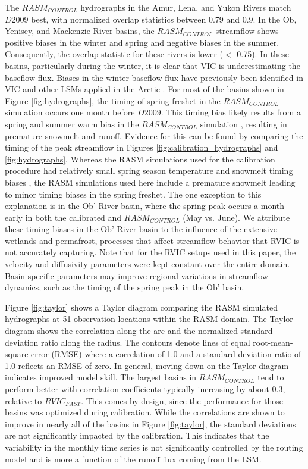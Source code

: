 \documentclass[jgrga, draft]{agutex}
\begin{document}
\begin{article}
The $RASM_{CONTROL}$ hydrographs in the Amur, Lena, and Yukon Rivers match $D2009$ best, with normalized overlap statistics between 0.79 and 0.9.
In the Ob, Yenisey, and Mackenzie River basins, the $RASM_{CONTROL}$ streamflow shows positive biases in the winter and spring and negative biases in the summer.
Consequently, the overlap statistic for these rivers is lower ($<$ 0.75).
In these basins, particularly during the winter, it is clear that VIC is underestimating the baseflow flux.
Biases in the winter baseflow flux have previously been identified in VIC and other LSMs applied in the Arctic \citep{Slater_2007}.
For most of the basins shown in Figure \ref{fig:hydrographs}, the timing of spring freshet in the $RASM_{CONTROL}$ simulation occurs one month before $D2009$.
This timing bias likely results from a spring and summer warm bias in the $RASM_{CONTROL}$ simulation \citep{Hamman_2016,Cassano_2016}, resulting in premature snowmelt and runoff.
Evidence for this can be found by comparing the timing of the peak streamflow in Figures \ref{fig:calibration_hydrographs} and \ref{fig:hydrographs}.
Whereas the RASM simulations used for the calibration procedure had relatively small spring season temperature and snowmelt timing biases \citep{Hamman_2016}, the RASM simulations used here include a premature snowmelt leading to minor timing biases in the spring freshet.
The one exception to this explanation is in the Ob' River basin, where the spring peak occurs a month early in both the calibrated and $RASM_{CONTROL}$ (May vs. June).
We attribute these timing biases in the Ob' River basin to the influence of the extensive wetlands and permafrost, processes that affect streamflow behavior that RVIC is not accurately capturing.
Note that for the RVIC setups used in this paper, the velocity and diffusivity parameters were kept constant over the entire domain.
Basin-specific parameters may improve regional variations in streamflow dynamics, such as the timing of the spring peak in the Ob' basin.

Figure \ref{fig:taylor} shows a Taylor diagram comparing the RASM simulated hydrographs at 51 observation locations within the RASM domain.
The Taylor diagram shows the correlation along the arc and the normalized standard deviation ratio along the radius.
The contours denote lines of equal root-mean-square error (RMSE) where a correlation of 1.0 and a standard deviation ratio of 1.0 reflects an RMSE of zero.
In general, moving down on the Taylor diagram indicates improved model skill.
The largest basins in $RASM_{CONTROL}$ tend to perform better with correlation coefficients typically increasing by about 0.3, relative to $RVIC_{FAST}$.
This comes by design, since the performance for those basins was optimized during calibration.
While the correlations are shown to improve in nearly all of the basins in Figure \ref{fig:taylor}, the standard deviations are not significantly impacted by the calibration.
This indicates that the variability in the monthly time series is not significantly controlled by the routing model and is more a function of the runoff flux coming from the LSM.


\end{article}
\end{document}
